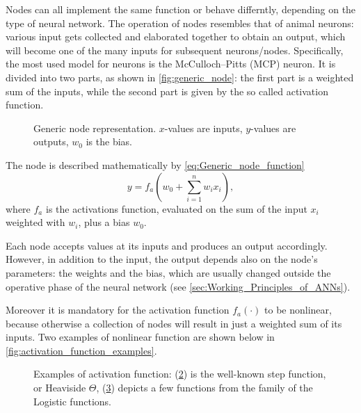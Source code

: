 Nodes can all implement the same function or behave differntly, depending on the type of neural network.
The operation of nodes resembles that of animal neurons: various input gets collected and elaborated together to obtain an output, which will become one of the many inputs for subsequent neurons/nodes.
Specifically, the most used model for neurons is the McCulloch–Pitts (MCP) neuron.
It is divided into two parts, as shown in \autoref{fig:generic_node}: the first part is a weighted sum of the inputs, while the second part is given by the so called activation function.

\begin{figure}[ht]
	\centering
	
	\caption{Generic node representation. $x$-values are inputs, $y$-values are outputs, $w_0$ is the bias.}
	\label{fig:generic_node}
\end{figure}
The node is described mathematically by \autoref{eq:Generic_node_function}
\begin{equation}
y = f_a \left(  w_0 + \sum_{i=1}^{n} w_i x_i \right),
\label{eq:Generic_node_function}
\end{equation}
where $f_a$ is the activations function, evaluated on the sum of the input $x_i$ weighted with $w_i$, plus a bias $w_0$.

Each node accepts values at its inputs and produces an output accordingly.
However, in addition to the input, the output depends also on the node's parameters: the weights and the bias, which are usually changed outside the operative phase of the neural network (see \autoref{sec:Working_Principles_of_ANNs}).

Moreover it is mandatory for the activation function $f_a\left(\cdot\right)$ to be nonlinear, because otherwise a collection of nodes will result in just a weighted sum of its inputs.
Two examples of nonlinear function are shown below in \autoref{fig:activation_function_examples}.

\begin{figure}[ht]
	\begin{subfigure}[b]{0.49\textwidth}
		\centering
		
		\caption{}
		\label{fig:activation_function_example_1}
  \end{subfigure}
  \begin{subfigure}[b]{0.49\textwidth}
  		\centering
		
		\caption{}
		\label{fig:activation_function_example_2}
  \end{subfigure}
  \caption{Examples of activation function: (\ref{fig:activation_function_example_1}) is the well-known step function, or Heaviside $\Theta$, (\ref{fig:activation_function_example_2}) depicts a few functions from the family of the Logistic functions.}
  	\label{fig:activation_function_examples}
\end{figure}

